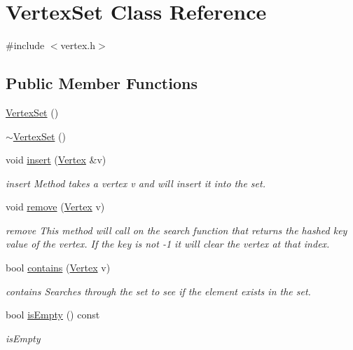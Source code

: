 \hypertarget{class_vertex_set}{}\section{Vertex\+Set Class Reference}
\label{class_vertex_set}


{\ttfamily \#include $<$vertex.\+h$>$}

\subsection*{Public Member Functions}
\begin{DoxyCompactItemize}
\item 
\hyperlink{class_vertex_set_af336e5d1260bc03a121ea4abfc5ac9ce}{Vertex\+Set} ()
\item 
\hyperlink{class_vertex_set_a0af0ebaf2ba75c5f3fd5f3c5b3e21d98}{$\sim$\+Vertex\+Set} ()
\item 
void \hyperlink{class_vertex_set_ac92d164e7a24400eb8ccbd336221b80c}{insert} (\hyperlink{class_vertex}{Vertex} \&v)
\begin{DoxyCompactList}\small\item\em insert Method takes a vertex v and will insert it into the set. \end{DoxyCompactList}\item 
void \hyperlink{class_vertex_set_a5f7d74712e5be14e15492e639fdd9a4f}{remove} (\hyperlink{class_vertex}{Vertex} v)
\begin{DoxyCompactList}\small\item\em remove This method will call on the search function that returns the hashed key value of the vertex. If the key is not -\/1 it will clear the vertex at that index. \end{DoxyCompactList}\item 
bool \hyperlink{class_vertex_set_ae373068b5abdc5ba9ef65c790d81578c}{contains} (\hyperlink{class_vertex}{Vertex} v)
\begin{DoxyCompactList}\small\item\em contains Searches through the set to see if the element exists in the set. \end{DoxyCompactList}\item 
bool \hyperlink{class_vertex_set_a0aaaf778c7e404b65c2151ab692a72d2}{is\+Empty} () const 
\begin{DoxyCompactList}\small\item\em is\+Empty \end{DoxyCompactList}\item 

\end{DoxyCompactItemize}
